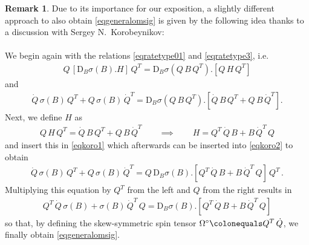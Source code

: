 \documentclass[10pt]{article}
\newcounter{theoremCounter}
\numberwithin{theoremCounter}{section}
\theoremstyle{plain}
\theoremstyle{definition}
\newtheorem{rem}[theoremCounter]{Remark}
\newcommand{\DD}{\mathrm{D}}
\numberwithin{equation}{section}
\begin{document}
\begin{rem}
Due to its importance for our exposition, a slightly different approach to also obtain \eqref{eqgeneralomsig} is given by the following idea thanks to a discussion with Sergey N.~Korobeynikov: \\
\\
We begin again with the relations \eqref{eqratetype01} and \eqref{eqratetype3}, i.e.
	\begin{align}
	\label{eqkoro1}
	Q \, [\DD_B\sigma(B).H] \, Q^T = \DD_B\sigma(Q \, B \, Q^T).[Q \, H \, Q^T]
	\end{align}
and
	\begin{align}
	\label{eqkoro2}
	\dot{Q} \, \sigma(B) \, Q^T + Q \, \sigma(B) \, \dot{Q}^T = \DD_B\sigma(Q \, B \, Q^T).[\dot{Q} \, B \, Q^T + Q \, B \, \dot{Q}^T].
	\end{align}
Next, we define $H$ as
	\begin{align}
	Q \, H \, Q^T = \dot Q \, B \, Q^T + Q \, B \, \dot Q^T \qquad \implies \qquad H = Q^T \, \dot Q \, B + B \, \dot Q^T \, Q
	\end{align}
and insert this in \eqref{eqkoro1} which afterwards can be inserted into \eqref{eqkoro2} to obtain
	\begin{align}
	\dot{Q} \, \sigma(B) \, Q^T + Q \, \sigma(B) \, \dot{Q}^T = Q \, \DD_B \sigma(B).[Q^T \, \dot Q \, B + B \, \dot Q^T \, Q] \, Q^T \, .
	\end{align}
Multiplying this equation by $Q^T$ from the left and $Q$ from the right results in
	\begin{align}
	Q^T \, \dot{Q} \, \sigma(B) + \sigma(B) \, \dot Q^T \, Q = \DD_B \sigma(B).[Q^T \, \dot Q \, B + B \, \dot Q^T \, Q]
	\end{align}
so that, by defining the skew-symmetric spin tensor $\Omega^{\circ}\colonequals Q^T \, \dot Q$, we finally obtain \eqref{eqgeneralomsig}.
\end{rem}
%
\pagebreak
\end{document}
